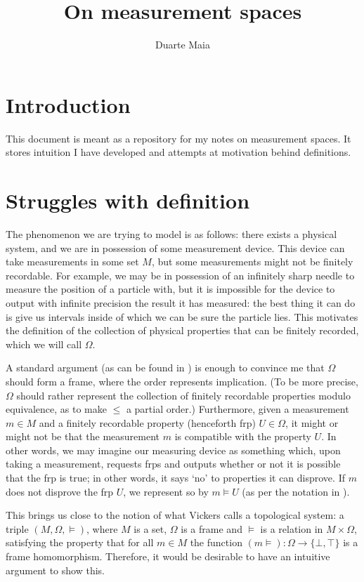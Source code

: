\documentclass{article}
\title{On measurement spaces}
\author{Duarte Maia}
\theoremstyle{definition}
\begin{document}
\maketitle

\section{Introduction}

This document is meant as a repository for my notes on measurement spaces. It stores intuition I have developed and attempts at motivation behind definitions.

\section{Struggles with definition}

The phenomenon we are trying to model is as follows: there exists a physical system, and we are in possession of some measurement device. This device can take measurements in some set $M$, but some measurements might not be finitely recordable. For example, we may be in possession of an infinitely sharp needle to measure the position of a particle with, but it is impossible for the device to output with infinite precision the result it has measured: the best thing it can do is give us intervals inside of which we can be sure the particle lies. This motivates the definition of the collection of physical properties that can be finitely recorded, which we will call $\Omega$.

A standard argument (as can be found in \cite{topologyvialogic}) is enough to convince me that $\Omega$ should form a frame, where the order represents implication. (To be more precise, $\Omega$ should rather represent the collection of finitely recordable properties modulo equivalence, as to make $\leq$ a partial order.) Furthermore, given a measurement $m \in M$ and a finitely recordable property (henceforth frp) $U \in \Omega$, it might or might not be that the measurement $m$ is compatible with the property $U$. In other words, we may imagine our measuring device as something which, upon taking a measurement, requests frps and outputs whether or not it is possible that the frp is true; in other words, it says `no' to properties it can disprove. If $m$ does not disprove the frp $U$, we represent so by $m \vDash U$ (as per the notation in \cite{topologyvialogic}).

This brings us close to the notion of what Vickers calls a topological system: a triple $(M, \Omega, \vDash)$, where $M$ is a set, $\Omega$ is a frame and $\vDash$ is a relation in $M \times \Omega$, satisfying the property that for all $m \in M$ the function $(m\vDash) \colon \Omega \to \{\bot, \top\}$ is a frame homomorphism. Therefore, it would be desirable to have an intuitive argument to show this.
\end{document}
